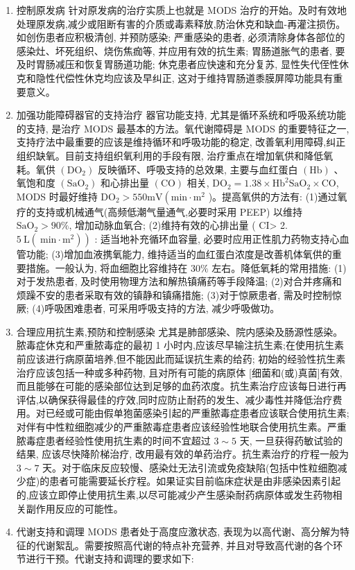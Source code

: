 \documentclass[10pt]{article}
\begin{document}
\begin{enumerate}
  \item 控制原发病 针对原发病的治疗实质上也就是 MODS 治疗的开始。及时有效地处理原发病,减少或阻断有害的介质或毒素释放,防治休克和缺血-再灌注损伤。如创伤患者应积极清创, 并预防感染; 严重感染的患者, 必须清除身体各部位的感染灶、坏死组织、烧伤焦痂等, 并应用有效的抗生素; 胃肠道胀气的患者, 要及时胃肠减压和恢复胃肠道功能; 休克患者应快速和充分复苏, 显性失代侄性休克和隐性代偿性休克均应该及早纠正, 这对于维持胃肠道黍膜屏障功能具有重要意义。

  \item 加强功能障碍器官的支持治疗 器官功能支持, 尤其是循环系统和呼吸系统功能的支持, 是治疗 MODS 最基本的方法。氧代谢障碍是 MODS 的重要特征之一, 支持疗法中最重要的应该是维持循环和呼吸功能的稳定, 改善氧利用障碍,纠正组织缺氧。目前支持组织氧利用的手段有限, 治疗重点在增加氧供和降低氧耗。氧供 $\left(\mathrm{DO}_{2}\right)$ 反映循环、呼吸支持的总效果, 主要与血红蛋白 $(\mathrm{Hb})$ 、氧饱和度 $\left(\mathrm{SaO}_{2}\right)$ 和心排出量 $(\mathrm{CO})$ 相关, $\mathrm{DO}_{2}=1.38 \times \mathrm{Hb}^{2} \mathrm{SaO}_{2} \times \mathrm{CO}$, MODS 时最好维持 $\mathrm{DO}_{2}>550 \mathrm{mV}\left(\mathrm{min} \cdot \mathrm{m}^{2}\right.$ )。提高氧供的方法有: (1)通过氧疗的支持或机械通气(高频低潮气量通气,必要时采用 PEEP) 以维持 $\mathrm{SaO}_{2}>90 \%$, 增加动脉血氧合; (2)维持有效的心排出量 ( CI> 2. $\left.5 \mathrm{~L}\left(\mathrm{~min} \cdot \mathrm{m}^{2}\right)\right)$ : 适当地补充循环血容量, 必要时应用正性肌力药物支持心血管功能; (3)增加血液携氧能力, 维持适当的血红蛋白浓度是改善机体氧供的重要措施。一般认为, 将血细胞比容维持在 $30 \%$ 左右。降低氧耗的常用措施: (1)对于发热患者, 及时使用物理方法和解热镇痛药等手段降温; (2)对合并疼痛和烦躁不安的患者采取有效的镇静和镇痛措施; (3)对于惊厥患者, 需及时控制惊厥; (4)呼吸困难患者, 可采用呼吸支持的方法, 减少呼吸做功。

  \item 合理应用抗生素,预防和控制感染 尤其是肺部感染、院内感染及肠源性感染。脓毒症休克和严重脓毒症的最初 1 小时内,应该尽早输注抗生素;在使用抗生素前应该进行病原菌培养,但不能因此而延误抗生素的给药; 初始的经验性抗生素治疗应该包括一种或多种药物, 且对所有可能的病原体 [细菌和(或)真菌]有效,而且能够在可能的感染部位达到足够的血药浓度。抗生素治疗应该每日进行再评估,以确保获得最佳的疗效,同时应防止耐药的发生、减少毒性并降低治疗费用。对已经或可能由假单狍菌感染引起的严重脓毒症患者应该联合使用抗生素; 对伴有中性粒细胞减少的严重脓毒症患者应该经验性地联合使用抗生素。严重脓毒症患者经验性使用抗生素的时间不宜超过 $3 \sim 5$ 天, 一旦获得药敏试验的结果, 应该尽快降阶梯治疗, 改用最有效的单药治疗。抗生素治疗的疗程一般为 $3 \sim 7$ 天。对于临床反应较慢、感染灶无法引流或免疫缺陷(包括中性粒细胞减少症)的患者可能需要延长疗程。如果证实目前临床症状是由非感染因素引起的,应该立即停止使用抗生素,以尽可能减少产生感染耐药病原体或发生药物相关副作用反应的可能性。

  \item 代谢支持和调理 MODS 患者处于高度应激状态, 表现为以高代谢、高分解为特征的代谢絮乱。需要按照高代谢的特点补充营养, 并且对导致高代谢的各个环节进行干预。代谢支持和调理的要求如下:

\end{enumerate}
\end{document}
